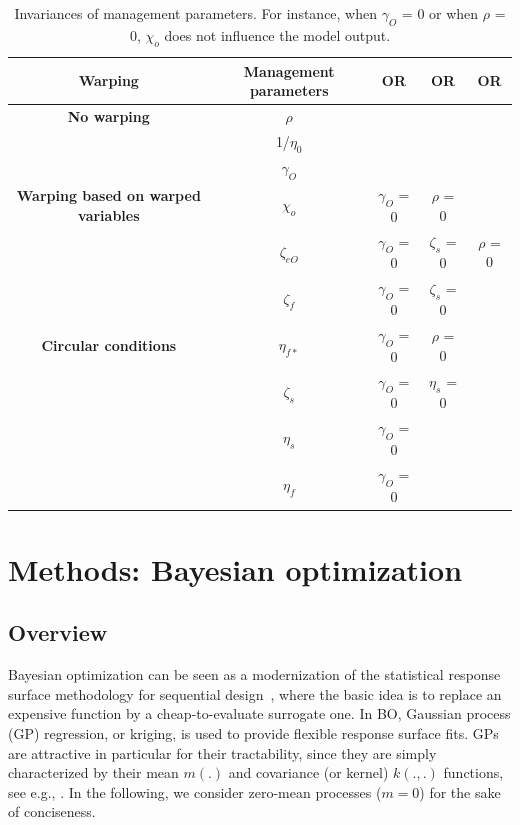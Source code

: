 \begin{table}[htbp]
	\centering
	\caption{Invariances of management parameters. For instance, when  $\gamma_{O}$ = 0 or when $\rho$ = 0, $\chi_{o}$ does not influence the model output. }
	\begin{tabular}{|c|c|c|c|c|}
		\midrule
		\textbf{Warping} & \textbf{Management parameters} & \textbf{OR} & \textbf{OR} & \textbf{OR} \\
		\midrule
		\textbf{No warping} & $\rho$ & & & \\
		\cmidrule{2-5} & 1/$\eta_{0}$ & & & \\
		\cmidrule{2-5} & $\gamma_{O}$ & & & \\
		\midrule
		\textbf{Warping based on warped variables} & $\chi_{o}$ & $\gamma_{O}$ = 0 & $\rho$ = 0 & \\
		\cmidrule{2-5} & $\zeta_{eO}$ & $\gamma_{O}$ = 0 & $\zeta_{s}$ = 0 & $\rho$ = 0\\
		\cmidrule{2-5} & $\zeta_{f}$ & $\gamma_{O}$ = 0 & $\zeta_{s}$ = 0 & \\
		\midrule
		\textbf{Circular conditions} & $\eta_{f*}$ & $\gamma_{O}$ = 0 & $\rho$ = 0 & \\
		\cmidrule{2-5} & $\zeta_{s}$ & $\gamma_{O}$ = 0 & $\eta_{s}$ = 0 & \\
		\cmidrule{2-5} & $\eta_{s}$ & $\gamma_{O}$ = 0 & & \\
		\cmidrule{2-5} & $\eta_{f}$ & $\gamma_{O}$ = 0 & & \\
		\midrule

	\end{tabular}%
	\label{tab:table_invariances_parameters}%
\end{table}%


\section{Methods: Bayesian optimization}\label{sec:bo}

\subsection{Overview}
Bayesian optimization can be seen as a modernization of the statistical response surface
methodology for sequential design~\cite{box1987empirical}, where the basic idea is to replace an expensive function by a cheap-to-evaluate surrogate one.
In BO, Gaussian process (GP) regression, or kriging, is used to provide flexible response surface fits.
GPs are attractive in particular for their tractability, 
since they are simply characterized by their mean $m(.)$ and covariance (or kernel) $k(.,.)$ functions, see e.g., \citet{Rasmussen2006}. 
In the following, we consider zero-mean processes ($m = 0$) for the sake of conciseness.

